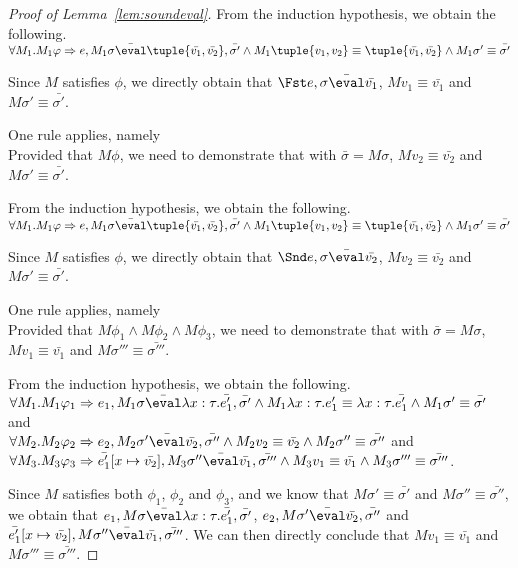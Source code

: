 \begin{proof}[Proof of Lemma~\ref{lem:soundeval}]
{  From the induction hypothesis, we obtain the following.\\
  $\forall M_1 . M_1\phi \implies e, M_1\sigma\bar{\eval}\tuple{\bar{v_1},\bar{v_2}},\bar{\sigma'}\land M_1\tuple{v_1,v_2}\equiv \tuple{\bar{v_1},\bar{v_2}}\land M_1\sigma'\equiv\bar{\sigma'}$

  Since $M$ satisfies $\phi$,
  we directly obtain that $\Fst e,\sigma\bar{\eval}\bar{v_1}$,
  $M v_1\equiv \bar{v_1}$ and $M\sigma'\equiv\bar{\sigma'}$.
  }

{ One rule applies, namely \\
  Provided that $M\phi$,
  we need to demonstrate that  with $\bar{\sigma}=M\sigma$,
  $M v_2\equiv \bar{v_2}$ and $M\sigma'\equiv\bar{\sigma'}$.

  From the induction hypothesis, we obtain the following.\\
  $\forall M_1 . M_1\phi \implies e, M_1\sigma\bar{\eval}\tuple{\bar{v_1},\bar{v_2}},\bar{\sigma'}\land M_1\tuple{v_1,v_2}\equiv \tuple{\bar{v_1},\bar{v_2}}\land M_1\sigma'\equiv\bar{\sigma'}$

  Since $M$ satisfies $\phi$,
  we directly obtain that $\Snd e,\sigma\bar{\eval}\bar{v_2}$,
  $M v_2\equiv \bar{v_2}$ and $M\sigma'\equiv\bar{\sigma'}$.
  }

  {One rule applies, namely \\
  Provided that $M\phi_1 \land M\phi_2\land M\phi_3$,
  we need to demonstrate that
   with $\bar{\sigma}=M\sigma$,
   $M v_1 \equiv \bar{v_1}$ and $M\sigma'''\equiv\bar{\sigma'''}$.

  From the induction hypothesis, we obtain the following.\\
  $\forall M_1 . M_1\phi_1 \implies e_1,M_1\sigma\bar{\eval}\lambda x : \tau.\bar{e_1'},\bar{\sigma'}
  \land M_1\lambda x : \tau.e_1' \equiv \lambda x : \tau.\bar{e_1'} \land M_1\sigma'\equiv\bar{\sigma'}$
  and\\
  $\forall M_2 . M_2\phi_2 \implies e_2,M_2\sigma'\bar{\eval}\bar{v_2},\bar{\sigma''}
  \land M_2 v_2 \equiv \bar{v_2} \land M_2\sigma'' \equiv\bar{\sigma''}$
  and\\
  $\forall M_3 . M_3\phi_3 \implies \bar{e_1'}[x\mapsto \bar{v_2}],M_3\sigma''\bar{\eval}\bar{v_1},\bar{\sigma'''}
  \land M_3 v_1\equiv \bar{v_1} \land M_3 \sigma'''\equiv\bar{\sigma'''}$.

  Since $M$ satisfies both $\phi_1$, $\phi_2$ and $\phi_3$, and we know that
  $M\sigma' \equiv\bar{\sigma'}$ and $M\sigma'' \equiv\bar{\sigma''}$,
  we obtain that $e_1,M\sigma \bar{\eval}\lambda x : \tau.\bar{e_1'},\bar{\sigma'}$, $e_2,M\sigma' \bar{\eval}\bar{v_2},\bar{\sigma''}$ and $\bar{e_1'}[x\mapsto \bar{v_2}],M\sigma'' \bar{\eval}\bar{v_1},\bar{\sigma'''}$.
  We can then directly conclude that $M v_1 \equiv \bar{v_1}$ and $M\sigma'''\equiv\bar{\sigma'''}$.
  }


\end{proof}
